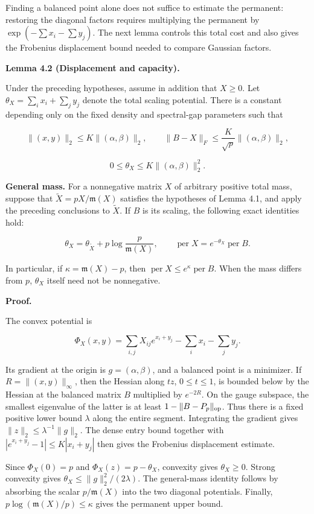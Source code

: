 \documentclass[11pt,a4paper]{article}
\begin{document}
Finding a balanced point alone does not suffice to estimate the permanent: restoring the diagonal factors requires multiplying the permanent by \(\exp(-\sum x_i-\sum y_j)\). The next lemma controls this total cost and also gives the Frobenius displacement bound needed to compare Gaussian factors.

\textbf{Lemma 4.2 (Displacement and capacity).}

Under the preceding hypotheses, assume in addition that \(X\ge0\). Let \(\theta_X=\sum_i x_i+\sum_j y_j\) denote the total scaling potential. There is a constant depending only on the fixed density and spectral-gap parameters such that

\[
\|(x,y)\|_2\le K\|(\alpha,\beta)\|_2,\qquad \|B-X\|_F\le\frac K{\sqrt p}\|(\alpha,\beta)\|_2,
\]

\[
0\le\theta_X\le K\|(\alpha,\beta)\|_2^2.
\]

\textbf{General mass.} For a nonnegative matrix \(X\) of arbitrary positive total mass, suppose that \(\widetilde X=pX/\mathfrak m(X)\) satisfies the hypotheses of Lemma 4.1, and apply the preceding conclusions to \(\widetilde X\). If \(B\) is its scaling, the following exact identities hold:

\[
\theta_X=\theta_{\widetilde X}+p\log\frac p{\mathfrak m(X)},\qquad \operatorname{per}X=e^{-\theta_X}\operatorname{per}B.
\]

In particular, if \(\kappa=\mathfrak m(X)-p\), then \(\operatorname{per}X\le e^\kappa\operatorname{per}B\). When the mass differs from \(p\), \(\theta_X\) itself need not be nonnegative.

\textbf{Proof.}

The convex potential is

\[
\Phi_X(x,y)=\sum_{i,j}X_{ij}e^{x_i+y_j}-\sum_i x_i-\sum_j y_j.
\]

Its gradient at the origin is \(g=(\alpha,\beta)\), and a balanced point is a minimizer. If \(R=\|(x,y)\|_\infty\), then the Hessian along \(tz\), \(0\le t\le1\), is bounded below by the Hessian at the balanced matrix \(B\) multiplied by \(e^{-2R}\). On the gauge subspace, the smallest eigenvalue of the latter is at least \(1-\|B-P_p\|_{\rm op}\). Thus there is a fixed positive lower bound \(\lambda\) along the entire segment. Integrating the gradient gives \(\|z\|_2\le\lambda^{-1}\|g\|_2\). The dense entry bound together with \(|e^{x_i+y_j}-1|\le K|x_i+y_j|\) then gives the Frobenius displacement estimate.

Since \(\Phi_X(0)=p\) and \(\Phi_X(z)=p-\theta_X\), convexity gives \(\theta_X\ge0\). Strong convexity gives \(\theta_X\le\|g\|_2^2/(2\lambda)\). The general-mass identity follows by absorbing the scalar \(p/\mathfrak m(X)\) into the two diagonal potentials. Finally, \(p\log(\mathfrak m(X)/p)\le\kappa\) gives the permanent upper bound.
\end{document}
